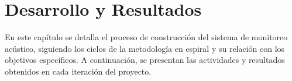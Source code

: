 \chapter{Desarrollo y Resultados}

En este capítulo se detalla el proceso de construcción del sistema de monitoreo acústico, siguiendo los ciclos de la metodología en espiral y su relación con los objetivos específicos. A continuación, se presentan las actividades y resultados obtenidos en cada iteración del proyecto.


